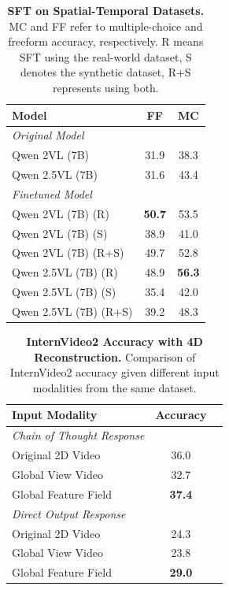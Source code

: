 \begin{table}[t]
    \centering
    \renewcommand{\arraystretch}{1.2}
    \begin{tabular}{l|cc}
        \toprule
        \textbf{Model} & \textbf{FF} & \textbf{MC} \\
        \midrule
        \rowcolor[HTML]{e1f0f5} \textit{Original Model} & \phantom{-} & \phantom{-} \\
        Qwen 2VL (7B) & 31.9 & 38.3 \\
        Qwen 2.5VL (7B) & 31.6 & 43.4 \\
        \midrule
        \rowcolor[HTML]{e1f0f5} \textit{Finetuned Model} & & \\
        Qwen 2VL (7B) (R) & \textbf{50.7} & 53.5 \\
        Qwen 2VL (7B) (S) & 38.9 & 41.0 \\
        Qwen 2VL (7B) (R+S) & 49.7 & 52.8 \\
        Qwen 2.5VL (7B) (R) & 48.9 & \textbf{56.3} \\
        Qwen 2.5VL (7B) (S) & 35.4 & 42.0 \\
        Qwen 2.5VL (7B) (R+S) & 39.2 & 48.3 \\
        \bottomrule
    \end{tabular}
    \caption{\textbf{SFT on Spatial-Temporal Datasets.} MC and FF refer to multiple-choice and freeform accuracy, respectively. R means SFT using the real-world dataset, S denotes the synthetic dataset, R+S represents using both.}
    \label{tab:sft}
\end{table}

\begin{table}[t]
    \centering
    \renewcommand{\arraystretch}{1.2}
    \begin{tabular}{l|cc}
        \toprule
        \textbf{Input Modality} & \textbf{Accuracy} \\
        \midrule
        \rowcolor[HTML]{e1f0f5} \textit{Chain of Thought Response} & \phantom{-} & \phantom{-} \\
        Original 2D Video & 36.0 \\
        Global View Video & 32.7 \\
        Global Feature Field & \textbf{37.4} \\
        \midrule
        \rowcolor[HTML]{e1f0f5} \textit{Direct Output Response} & & \\
        Original 2D Video & 24.3 \\
        Global View Video & 23.8 \\
        Global Feature Field & \textbf{29.0} \\
        \bottomrule
    \end{tabular}
    \caption{\textbf{InternVideo2 Accuracy with 4D Reconstruction.} Comparison of InternVideo2 accuracy given different input modalities from the same dataset.}
    \label{tab:4D_recon_results}
    \vspace{-0.3cm}
\end{table}

